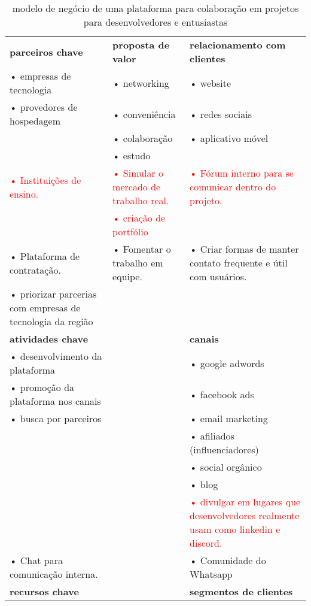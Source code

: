 \documentclass{article}
\begin{document}
\vspace{0.5cm}

\begin{table}[H]
\centering
\caption{modelo de negócio de uma plataforma para colaboração em projetos para desenvolvedores e entusiastas}
\renewcommand{\arraystretch}{1.8}
\setlength{\tabcolsep}{4pt}
\begin{tabular}{|p{6cm}|p{6cm}|p{6cm}|}
\hline
\rowcolor{lightgray}
\textbf{parceiros chave} &
\centering\textbf{proposta de valor} &
\textbf{relacionamento com clientes} \\
\cline{1-1}\cline{2-2}\cline{3-3}
• empresas de tecnologia & • networking & • website \\
• provedores de hospedagem & • conveniência & • redes sociais \\
& • colaboração & • aplicativo móvel \\
& • estudo & \\
\textcolor{red}{• Instituições de ensino.} &
\textcolor{red}{• Simular o mercado de trabalho real.} &
\textcolor{red}{• Fórum interno para se comunicar dentro do projeto.} \\
& \textcolor{red}{• criação de portfólio} & \\
\textcolor{blueval}{• Plataforma de contratação.} &
\textcolor{blueval}{• Fomentar o trabalho em equipe.} &
\textcolor{blueval}{• Criar formas de manter contato frequente e útil com usuários.} \\
\textcolor{blueval}{• priorizar parcerias com empresas de tecnologia da região} & & \\
\hline
\rowcolor{lightgray}
\textbf{atividades chave} & & \textbf{canais} \\
\cline{1-1}\cline{2-2}\cline{3-3}
• desenvolvimento da plataforma & & • google adwords \\
• promoção da plataforma nos canais & & • facebook ads \\
• busca por parceiros & & • email marketing \\
& & • afiliados (influenciadores) \\
& & • social orgânico \\
& & • blog \\
& & \textcolor{red}{• divulgar em lugares que desenvolvedores realmente usam como linkedin e discord.} \\
\textcolor{blueval}{• Chat para comunicação interna.} &
& 
\textcolor{blueval}{• Comunidade do Whatsapp} \\
\hline
\rowcolor{lightgray}
\textbf{recursos chave} & & \textbf{segmentos de clientes} \\

\end{tabular}
\end{table}
\end{document}
